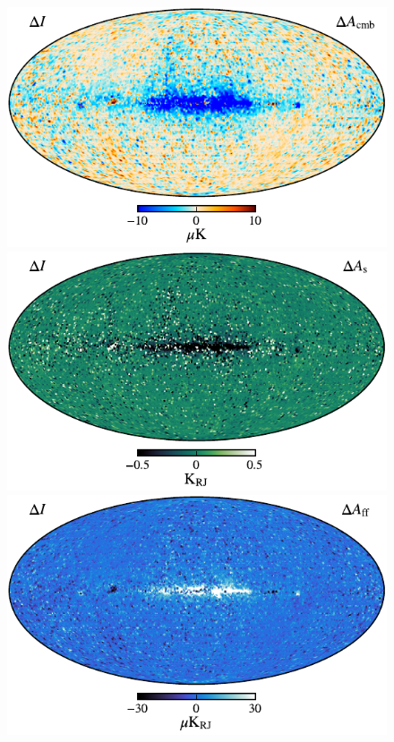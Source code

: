\documentclass[twocolumn]{aa}
\begin{document}
\begin{figure}[t]
  \center
  \includegraphics[width=0.95\linewidth]{figs/cmb_diff.pdf}\\
  \includegraphics[width=0.95\linewidth]{figs/synch_diff.pdf}\\
  \includegraphics[width=0.95\linewidth]{figs/freefree_diff.pdf}\\

\end{figure}
\end{document}
